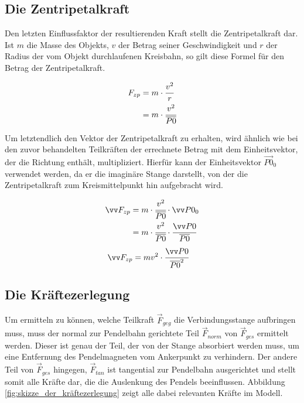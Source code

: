\subsection{Die Zentripetalkraft}
\label{ssec:die_zentripetalkraft}

Den letzten Einflussfaktor der resultierenden Kraft stellt die Zentripetalkraft dar. Ist $m$ die Masse des Objekts, $v$ der Betrag seiner Geschwindigkeit und $r$ der Radius der vom Objekt durchlaufenen Kreisbahn, so gilt diese Formel für den Betrag der Zentripetalkraft.

\begin{align*}
    F_{zp} &= m \cdot \cfrac{v^2}{r} \\
           &= m \cdot \cfrac{v^2}{\overline{P0}}
\end{align*}

Um letztendlich den Vektor der Zentripetalkraft zu erhalten, wird ähnlich wie bei den zuvor behandelten Teilkräften der errechnete Betrag mit dem Einheitsvektor, der die Richtung enthält, multipliziert. Hierfür kann der Einheitsvektor $\vec{P0}_{0}$ verwendet werden, da er die imaginäre Stange darstellt, von der die Zentripetalkraft zum Kreismittelpunkt hin aufgebracht wird.

\begin{align*}
    \vec{F}_{zp} &= m \cdot \cfrac{v^2}{\overline{P0}} \cdot \vec{P0}_{0} \\
                 &= m \cdot \cfrac{v^2}{\overline{P0}} \cdot \cfrac{\vec{P0}}{\overline{P0}}
\end{align*}
\begin{align} \label{f_zp}
    \vec{F}_{zp} &= m v^2 \cdot \cfrac{\vec{P0}}{\overline{P0}^2}
\end{align}

\subsection{Die Kräftezerlegung}
\label{ssec:die_kräftezerlegung}

Um ermitteln zu können, welche Teilkraft $\vec{F}_{geg}$ die Verbindungsstange aufbringen muss, muss der normal zur Pendelbahn gerichtete Teil $\vec{F}_{norm}$ von $\vec{F}_{ges}$ ermittelt werden. Dieser ist genau der Teil, der von der Stange absorbiert werden muss, um eine Entfernung des Pendelmagneten vom Ankerpunkt zu verhindern. Der andere Teil von $\vec{F}_{ges}$ hingegen, $\vec{F}_{tan}$ ist tangential zur Pendelbahn ausgerichtet und stellt somit alle Kräfte dar, die die Auslenkung des Pendels beeinflussen. Abbildung \ref{fig:skizze_der_kräftezerlegung} zeigt alle dabei relevanten Kräfte im Modell.

